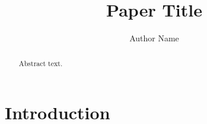 \documentclass[conference]{IEEEtran}
\begin{document}
\title{Paper Title}
\author{Author Name}
\maketitle
\begin{abstract}
Abstract text.
\end{abstract}
\section{Introduction}
\end{document}
